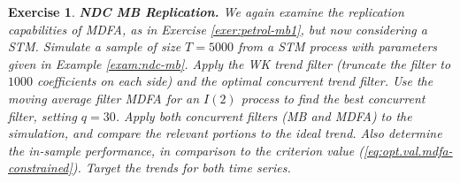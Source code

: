 \documentclass[a4paper]{book}
\newtheorem{Exercise}{Exercise}
\begin{document}
 
\begin{Exercise} {\bf NDC MB Replication.}  \rm
\label{exer:ndc-mb1}
 We again examine the replication capabilities of MDFA, 
 as in Exercise \ref{exer:petrol-mb1},
 but now considering a STM.  
 Simulate a sample of size $T=5000$ from a STM process with parameters
 given in Example \ref{exam:ndc-mb}.   Apply the WK trend filter
(truncate the filter to $1000$ coefficients on each side) and the 
 optimal concurrent trend filter.  
 Use the moving average filter  MDFA  for an $I(2)$ process  to find the best
 concurrent filter, setting $q= 30$.
    Apply both concurrent filters (MB and MDFA)
 to the simulation, and compare the relevant portions to the ideal trend.
 Also determine the in-sample performance, in comparison to the criterion value
 (\ref{eq:opt.val.mdfa-constrained}).   Target the trends for both time series.
\end{Exercise}
\end{document}
